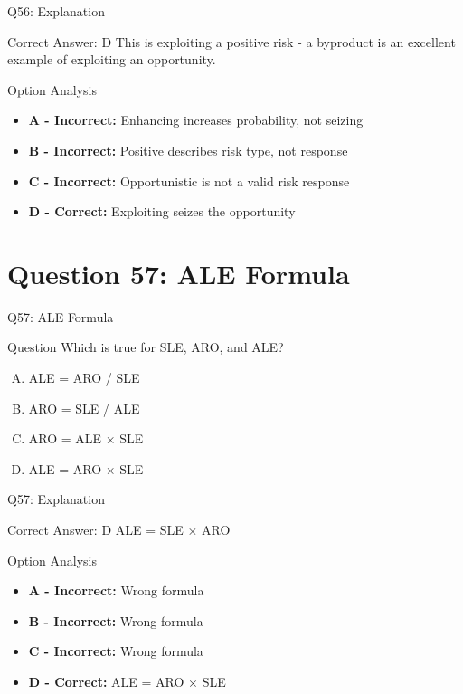 \documentclass{beamer}
\begin{document}
	\begin{frame}{Q56: Explanation}
		\begin{block}{Correct Answer: D}
			This is exploiting a positive risk - a byproduct is an excellent example of exploiting an opportunity.
		\end{block}
		\begin{block}{Option Analysis}
			\begin{itemize}
				\item \textbf{A - Incorrect:} Enhancing increases probability, not seizing
				\item \textbf{B - Incorrect:} Positive describes risk type, not response
				\item \textbf{C - Incorrect:} Opportunistic is not a valid risk response
				\item \textbf{D - Correct:} Exploiting seizes the opportunity
			\end{itemize}
		\end{block}
	\end{frame}
	
	\section{Question 57: ALE Formula}
	
	\begin{frame}{Q57: ALE Formula}
		\begin{block}{Question}
			Which is true for SLE, ARO, and ALE?
		\end{block}
		\begin{enumerate}[(A)]
			\item ALE = ARO / SLE
			\item ARO = SLE / ALE
			\item ARO = ALE × SLE
			\item ALE = ARO × SLE
		\end{enumerate}
	\end{frame}
	
	\begin{frame}{Q57: Explanation}
		\begin{block}{Correct Answer: D}
			ALE = SLE × ARO
		\end{block}
		\begin{block}{Option Analysis}
			\begin{itemize}
				\item \textbf{A - Incorrect:} Wrong formula
				\item \textbf{B - Incorrect:} Wrong formula
				\item \textbf{C - Incorrect:} Wrong formula
				\item \textbf{D - Correct:} ALE = ARO × SLE
			\end{itemize}
		\end{block}
	\end{frame}
	
\end{document}

